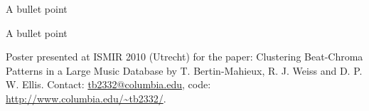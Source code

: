 \documentclass[landscape,a0b,final]{a0poster}
\newenvironment{poster}{
  \begin{center}
  \begin{minipage}[c]{0.98\textwidth}
}{
  \end{minipage} 
  \end{center}
}
\begin{document}
\begin{poster}
\begin{multicols}{3}
\vspace{1.0cm}

\begin{list}{}{\leftmargin=2em =1em}
\item A bullet point
\item A bullet point
\end{list}




\begin{small}


\end{small}

\end{multicols}

\vspace{1cm}
\begin{minipage}{\textwidth}
\begin{small}
\begin{flushright}
Poster presented at ISMIR 2010 (Utrecht) for the paper:
Clustering Beat-Chroma Patterns in a Large Music Database by
T. Bertin-Mahieux, R. J. Weiss and D. P. W. Ellis. Contact:
\url{tb2332@columbia.edu}, code: \url{http://www.columbia.edu/~tb2332/}.
\end{flushright}
\end{small}
\end{minipage}

\end{poster}
\end{document}
